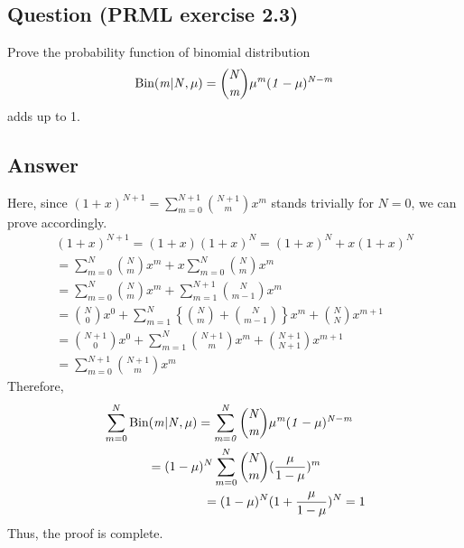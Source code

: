 \documentclass[11pt, oneside]{article}
\begin{document}
\subsection{Question (PRML exercise 2.3)}
Prove the probability function of binomial distribution
$$\rm Bin\it(m|N, \mu)=\binom{N}{m}\mu^m(1-\mu)^{N-m}$$
adds up to 1.
\subsection{Answer}
Here, since $(1+x)^{N+1} = \sum_{m=0}^{N+1}\binom{N+1}{m}x^m$ stands trivially for $N=0$, we can prove accordingly.
\begin{equation*}
\begin{multlined}
(1+x)^{N+1}=(1+x)(1+x)^N=(1+x)^N+x(1+x)^N\\
=\sum_{m=0}^{N}\binom{N}{m}x^m+x\sum_{m=0}^{N}\binom{N}{m}x^m\\
=\sum_{m=0}^{N}\binom{N}{m}x^m+\sum_{m=1}^{N+1}\binom{N}{m-1}x^m\\
=\binom{N}{0}x^0+\sum_{m=1}^{N}\left\{\binom{N}{m}+\binom{N}{m-1}\right\}x^m +\binom{N}{N}x^{m+1}\\
=\binom{N+1}{0}x^0+\sum_{m=1}^{N}\binom{N+1}{m}x^m +\binom{N+1}{N+1}x^{m+1}\\
=\sum_{m=0}^{N+1}\binom{N+1}{m}x^m
\end{multlined}
\end{equation*}
Therefore,
\begin{equation*}
\begin{multlined}
\sum_{m=0}^{N}\rm Bin\it(m|N, \mu)=\sum_{m=0}^{N}\binom{N}{m}\mu^m(1-\mu)^{N-m}\\
=(1-\mu)^N\sum_{m=0}^{N}\binom{N}{m}(\frac{\mu}{1-\mu})^m\\
=(1-\mu)^N(1+\frac{\mu}{1-\mu})^N
=1
\end{multlined}
\end{equation*}
Thus, the proof is complete.\\
\end{document}
